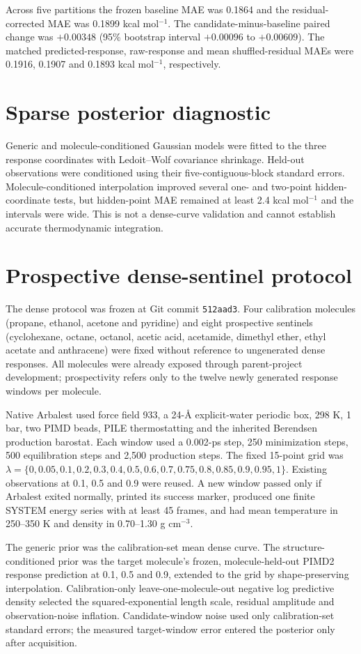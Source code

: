 \documentclass[11pt]{article}
\begin{document}
Across five partitions the frozen baseline MAE was 0.1864 and the residual-corrected MAE was 0.1899 kcal mol$^{-1}$. The candidate-minus-baseline paired change was $+0.00348$ (95\% bootstrap interval $+0.00096$ to $+0.00609$). The matched predicted-response, raw-response and mean shuffled-residual MAEs were 0.1916, 0.1907 and 0.1893 kcal mol$^{-1}$, respectively.

\section{Sparse posterior diagnostic}
Generic and molecule-conditioned Gaussian models were fitted to the three response coordinates with Ledoit--Wolf covariance shrinkage. Held-out observations were conditioned using their five-contiguous-block standard errors. Molecule-conditioned interpolation improved several one- and two-point hidden-coordinate tests, but hidden-point MAE remained at least 2.4 kcal mol$^{-1}$ and the intervals were wide. This is not a dense-curve validation and cannot establish accurate thermodynamic integration.
\section{Prospective dense-sentinel protocol}
The dense protocol was frozen at Git commit \texttt{512aad3}. Four calibration molecules (propane, ethanol, acetone and pyridine) and eight prospective sentinels (cyclohexane, octane, octanol, acetic acid, acetamide, dimethyl ether, ethyl acetate and anthracene) were fixed without reference to ungenerated dense responses. All molecules were already exposed through parent-project development; prospectivity refers only to the twelve newly generated response windows per molecule.

Native Arbalest used force field 933, a 24-\AA{} explicit-water periodic box, 298 K, 1 bar, two PIMD beads, PILE thermostatting and the inherited Berendsen production barostat. Each window used a 0.002-ps step, 250 minimization steps, 500 equilibration steps and 2,500 production steps. The fixed 15-point grid was $\lambda=\{0,0.05,0.1,0.2,0.3,0.4,0.5,0.6,0.7,0.75,0.8,0.85,0.9,0.95,1\}$. Existing observations at 0.1, 0.5 and 0.9 were reused. A new window passed only if Arbalest exited normally, printed its success marker, produced one finite SYSTEM energy series with at least 45 frames, and had mean temperature in 250--350 K and density in 0.70--1.30 g cm$^{-3}$.

The generic prior was the calibration-set mean dense curve. The structure-conditioned prior was the target molecule's frozen, molecule-held-out PIMD2 response prediction at 0.1, 0.5 and 0.9, extended to the grid by shape-preserving interpolation. Calibration-only leave-one-molecule-out negative log predictive density selected the squared-exponential length scale, residual amplitude and observation-noise inflation. Candidate-window noise used only calibration-set standard errors; the measured target-window error entered the posterior only after acquisition.
\end{document}
